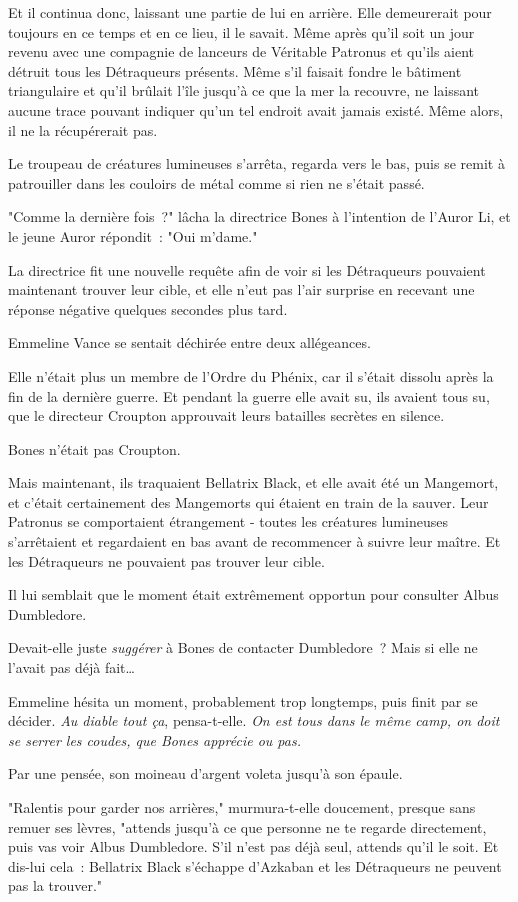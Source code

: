 Et il continua donc, laissant une partie de lui en arrière. Elle demeurerait pour toujours en ce temps et en ce lieu, il le savait. Même après qu'il soit un jour revenu avec une compagnie de lanceurs de Véritable Patronus et qu'ils aient détruit tous les Détraqueurs présents. Même s'il faisait fondre le bâtiment triangulaire et qu'il brûlait l'île jusqu'à ce que la mer la recouvre, ne laissant aucune trace pouvant indiquer qu'un tel endroit avait jamais existé. Même alors, il ne la récupérerait pas.

\later

Le troupeau de créatures lumineuses s'arrêta, regarda vers le bas, puis se remit à patrouiller dans les couloirs de métal comme si rien ne s'était passé.

"Comme la dernière fois~?" lâcha la directrice Bones à l'intention de l'Auror Li, et le jeune Auror répondit~: "Oui m'dame."

La directrice fit une nouvelle requête afin de voir si les Détraqueurs pouvaient maintenant trouver leur cible, et elle n'eut pas l'air surprise en recevant une réponse négative quelques secondes plus tard.

Emmeline Vance se sentait déchirée entre deux allégeances.

Elle n'était plus un membre de l'Ordre du Phénix, car il s'était dissolu après la fin de la dernière guerre. Et pendant la guerre elle avait su, ils avaient tous su, que le directeur Croupton approuvait leurs batailles secrètes en silence.

Bones n'était pas Croupton.

Mais maintenant, ils traquaient Bellatrix Black, et elle avait été un Mangemort, et c'était certainement des Mangemorts qui étaient en train de la sauver. Leur Patronus se comportaient étrangement - toutes les créatures lumineuses s'arrêtaient et regardaient en bas avant de recommencer à suivre leur maître. Et les Détraqueurs ne pouvaient pas trouver leur cible.

Il lui semblait que le moment était extrêmement opportun pour consulter Albus Dumbledore.

Devait-elle juste \emph{suggérer} à Bones de contacter Dumbledore~? Mais si elle ne l'avait pas déjà fait…

Emmeline hésita un moment, probablement trop longtemps, puis finit par se décider. \emph{Au diable tout ça}, pensa-t-elle. \emph{On est tous dans le même camp, on doit se serrer les coudes, que Bones apprécie ou pas.}

Par une pensée, son moineau d'argent voleta jusqu'à son épaule.

"Ralentis pour garder nos arrières," murmura-t-elle doucement, presque sans remuer ses lèvres, "attends jusqu'à ce que personne ne te regarde directement, puis vas voir Albus Dumbledore. S'il n'est pas déjà seul, attends qu'il le soit. Et dis-lui cela~: Bellatrix Black s'échappe d'Azkaban et les Détraqueurs ne peuvent pas la trouver." 

